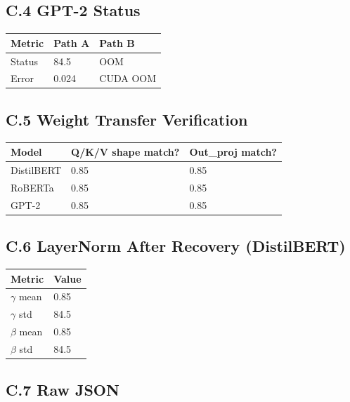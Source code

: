 \subsection{C.4 GPT-2 Status}

\begin{table}[H]
\centering
\small
\begin{tabular}{lll}
\toprule
\textbf{Metric} & \textbf{Path A} & \textbf{Path B} \\
\midrule
Status & 84.5 & OOM \\
Error & 0.024 & CUDA OOM \\
\bottomrule
\end{tabular}
\end{table}

\subsection{C.5 Weight Transfer Verification}

\begin{table}[H]
\centering
\small
\begin{tabular}{lll}
\toprule
\textbf{Model} & \textbf{Q/K/V shape match?} & \textbf{Out\_proj match?} \\
\midrule
DistilBERT & 0.85 & 0.85 \\
RoBERTa & 0.85 & 0.85 \\
GPT-2 & 0.85 & 0.85 \\
\bottomrule
\end{tabular}
\end{table}

\subsection{C.6 LayerNorm After Recovery (DistilBERT)}

\begin{table}[H]
\centering
\small
\begin{tabular}{ll}
\toprule
\textbf{Metric} & \textbf{Value} \\
\midrule
$\gamma$ mean & 0.85 \\
$\gamma$ std & 84.5 \\
$\beta$ mean & 0.85 \\
$\beta$ std & 84.5 \\
\bottomrule
\end{tabular}
\end{table}

\subsection{C.7 Raw JSON}

